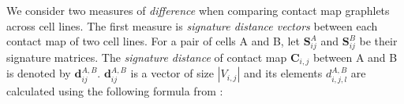 \documentclass[a4,center,fleqn]{NAR}
\begin{document}
%


We consider two measures of \textit{difference} when comparing contact
map graphlets across cell lines. 
The first measure is \textit{signature distance vectors} between
each contact map of two cell lines. 
For a pair of cells A and B, let 
$\mathbf{S}^A_{ij}$  and $\mathbf{S}^B_{ij}$ be their
signature matrices. The \textit{signature distance} of
contact map $\mathbf{C}_{i,j}$ between A and B is denoted
by $\mathbf{d}^{\scriptscriptstyle A,B}_{ij}$. $\mathbf{d}^{\scriptscriptstyle A,B}_{ij}$ 
is a vector of size $|V_{i,j}|$
and its elements $d^{\scriptscriptstyle A,B}_{i,j,l}$ are
calculated using the following formula from \cite{prvzulj2007biological}:
\end{document}
